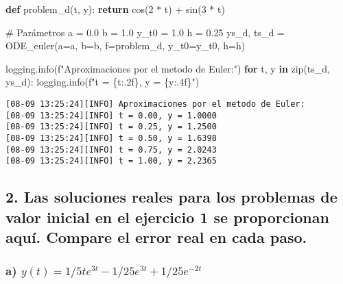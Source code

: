 \documentclass[
  letterpaper,
  DIV=11,
  numbers=noendperiod]{scrartcl}
\newenvironment{Shaded}{\begin{snugshade}}{\end{snugshade}}
\newcommand{\BuiltInTok}[1]{\textcolor[rgb]{0.00,0.23,0.31}{#1}}
\newcommand{\CommentTok}[1]{\textcolor[rgb]{0.37,0.37,0.37}{#1}}
\newcommand{\ControlFlowTok}[1]{\textcolor[rgb]{0.00,0.23,0.31}{\textbf{#1}}}
\newcommand{\DecValTok}[1]{\textcolor[rgb]{0.68,0.00,0.00}{#1}}
\newcommand{\FloatTok}[1]{\textcolor[rgb]{0.68,0.00,0.00}{#1}}
\newcommand{\KeywordTok}[1]{\textcolor[rgb]{0.00,0.23,0.31}{\textbf{#1}}}
\newcommand{\NormalTok}[1]{\textcolor[rgb]{0.00,0.23,0.31}{#1}}
\newcommand{\OperatorTok}[1]{\textcolor[rgb]{0.37,0.37,0.37}{#1}}
\newcommand{\SpecialCharTok}[1]{\textcolor[rgb]{0.37,0.37,0.37}{#1}}
\newcommand{\SpecialStringTok}[1]{\textcolor[rgb]{0.13,0.47,0.30}{#1}}
\begin{document}
\begin{Shaded}
\begin{Highlighting}[]
\KeywordTok{def}\NormalTok{ problem\_d(t, y):}
    \ControlFlowTok{return}\NormalTok{ cos(}\DecValTok{2} \OperatorTok{*}\NormalTok{ t) }\OperatorTok{+}\NormalTok{ sin(}\DecValTok{3} \OperatorTok{*}\NormalTok{ t)}

\CommentTok{\# Parámetros}
\NormalTok{a }\OperatorTok{=} \FloatTok{0.0}  
\NormalTok{b }\OperatorTok{=} \FloatTok{1.0}  
\NormalTok{y\_t0 }\OperatorTok{=} \FloatTok{1.0}  
\NormalTok{h }\OperatorTok{=} \FloatTok{0.25}  
\NormalTok{ys\_d, ts\_d }\OperatorTok{=}\NormalTok{ ODE\_euler(a}\OperatorTok{=}\NormalTok{a, b}\OperatorTok{=}\NormalTok{b, f}\OperatorTok{=}\NormalTok{problem\_d, y\_t0}\OperatorTok{=}\NormalTok{y\_t0, h}\OperatorTok{=}\NormalTok{h)}

\NormalTok{logging.info(}\SpecialStringTok{f"Aproximaciones por el metodo de Euler:"}\NormalTok{)}
\ControlFlowTok{for}\NormalTok{ t, y }\KeywordTok{in} \BuiltInTok{zip}\NormalTok{(ts\_d, ys\_d):}
\NormalTok{    logging.info(}\SpecialStringTok{f"t = }\SpecialCharTok{\{}\NormalTok{t}\SpecialCharTok{:.2f\}}\SpecialStringTok{, y = }\SpecialCharTok{\{}\NormalTok{y}\SpecialCharTok{:.4f\}}\SpecialStringTok{"}\NormalTok{)}
\end{Highlighting}
\end{Shaded}

\begin{verbatim}
[08-09 13:25:24][INFO] Aproximaciones por el metodo de Euler:
[08-09 13:25:24][INFO] t = 0.00, y = 1.0000
[08-09 13:25:24][INFO] t = 0.25, y = 1.2500
[08-09 13:25:24][INFO] t = 0.50, y = 1.6398
[08-09 13:25:24][INFO] t = 0.75, y = 2.0243
[08-09 13:25:24][INFO] t = 1.00, y = 2.2365
\end{verbatim}

\subsection{2. Las soluciones reales para los problemas de valor inicial
en el ejercicio 1 se proporcionan aquí. Compare el error real en cada
paso.}\label{las-soluciones-reales-para-los-problemas-de-valor-inicial-en-el-ejercicio-1-se-proporcionan-aquuxed.-compare-el-error-real-en-cada-paso.}

\subsubsection{\texorpdfstring{a)
\(y(t)=1/5te^{3t}-1/25e^{3t}+1/25e^{-2t}\)}{a) y(t)=1/5te\^{}\{3t\}-1/25e\^{}\{3t\}+1/25e\^{}\{-2t\}}}\label{a-yt15te3t-125e3t125e-2t}
\end{document}
